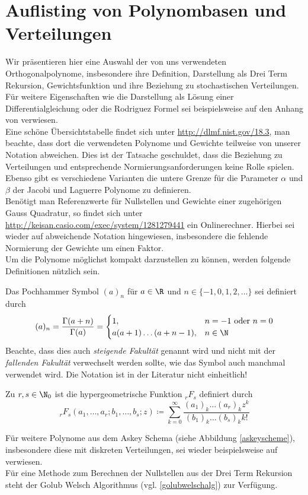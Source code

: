 \section{Auflisting von Polynombasen und Verteilungen}
Wir präsentieren hier eine Auswahl der von uns verwendeten Orthogonalpolynome, insbesondere ihre Definition, Darstellung als Drei Term Rekursion, Gewichtsfunktion und ihre Beziehung zu stochastischen Verteilungen. Für weitere Eigenschaften wie die Darstellung als Lösung einer Differentialgleichung oder die Rodriguez Formel sei beispielsweise auf den Anhang von \autocite{dongbinxiu2010} verwiesen.\\
Eine schöne Übersichtstabelle findet sich unter \url{http://dlmf.nist.gov/18.3}, man beachte, dass dort die verwendeten Polynome und Gewichte teilweise von unserer Notation abweichen. Dies ist der Tatsache geschuldet, dass die Beziehung zu Verteilungen und entsprechende Normierungsanforderungen keine Rolle spielen. Ebenso gibt es verschiedene Varianten die untere Grenze für die Parameter $\alpha$ und $\beta$ der Jacobi und Laguerre Polynome zu definieren.\\
Benötigt man Referenzwerte für Nullstellen und Gewichte einer zugehörigen Gauss Quadratur, so findet sich unter\\\url{http://keisan.casio.com/exec/system/1281279441} ein Onlinerechner. Hierbei sei wieder auf abweichende Notation hingewiesen, insbesondere die fehlende Normierung der Gewichte um einen Faktor.\\
Um die Polynome möglichst kompakt darzustellen zu können, werden folgende Definitionen nützlich sein.
\begin{mathdef}
Das Pochhammer Symbol $(a)_n$ für $a\in\R$ und $n\in\lbrace -1,0,1,2,\dots\rbrace$ sei definiert durch
\[(a)_n=\frac{\Gamma(a+n)}{\Gamma(a)}=
   \begin{cases}
   1, &n=-1\text{ oder } n=0\\
   a(a+1)\dots (a+n-1), &n\in\N
   \end{cases}
   \]
Beachte, dass dies auch \emph{steigende Fakultät} genannt wird und nicht mit der \emph{fallenden Fakultät} verwechselt werden sollte, wie das Symbol auch manchmal verwendet wird. Die Notation ist in der Literatur nicht einheitlich!
\end{mathdef}

\begin{mathdef}
Zu $r,s\in\N_0$ ist die hypergeometrische Funktion $_rF_s$ definiert durch
\[_rF_s(a_1,\dots,a_r;b_1,\dots,b_s;z)\coloneqq \sum_{k=0}^\infty \frac{(a_1)_k\dots (a_r)_kz^k}{(b_1)_k\dots(b_s)_kk!}\]
\end{mathdef}
Für weitere Polynome aus dem Askey Schema (siehe Abbildung \ref{askeyscheme}), insbesondere diese mit diskreten Verteilungen, sei wieder beispielsweise auf \autocite{dongbinxiu2010} verwiesen. \\
Für eine Methode zum Berechnen der Nullstellen aus der Drei Term Rekursion steht der Golub Welsch Algorithmus (vgl. \ref{golubwelschalg}) zur Verfügung.
